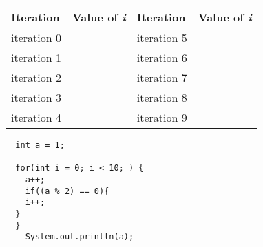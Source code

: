 \documentclass{article}
\begin{document}
\begin{flushleft}
\begin{tabu} to 80mm { | X[l] | X[c] | | X[l] | X[c] | }
 \hline
 \textbf{Iteration}  & \textbf{Value of \emph{i}} &  \textbf{Iteration}  & \textbf{Value of \emph{i}} \\
 \hline
 iteration 0  & \ & iteration 5  & \  \\
 \hline
 iteration 1 &  \  & iteration 6  & \ \\
 \hline
 iteration 2 &   \ & iteration 7  & \ \\
 \hline
 iteration 3 &  \  & iteration 8  & \ \\
 \hline
 iteration 4 &  \  & iteration 9  & \ \\
 \hline

\hline
\end{tabu}


\begin{comment}
\begin{center}
\begin{tabular}{ c c c }
 cell1 & cell2 & cell3 \\ 
 cell4 & cell5 & cell6 \\  
 cell7 & cell8 & cell9    
\end{tabular}
\end{center}
\end{comment}

\begin{comment}
\begin{tabu} to 1.8\textwidth { | X[l] | X[c] | X[r] | }
 \hline
 Iterat  & Value of I & item 13 \\
 \hline
 item 21  & item 22  & item 23  \\
\hline
\end{tabu}
\end{comment}



\begin{verbatim}
  int a = 1;
  
  for(int i = 0; i < 10; ) {
    a++;
    if((a % 2) == 0){
    i++;
  }
  }
    System.out.println(a);
\end{verbatim}














\end{flushleft}










\begin{comment}
\begin{verbatim}
  int main() {
    printf('hello world'):
    return 0;
  }
\end{verbatim}
\end{comment}
\end{document}
